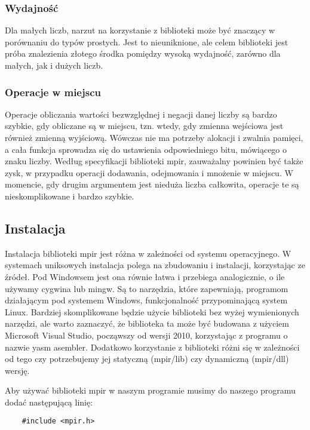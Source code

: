 \documentclass[oneside,a4paper]{book}
\begin{document}
	\subsubsection{Wydajność}
	Dla małych liczb, narzut na korzystanie z biblioteki może być znaczący w porównaniu do typów prostych. Jest to nieuniknione, ale celem biblioteki jest próba znalezienia złotego środka pomiędzy wysoką wydajność, zarówno dla małych, jak i dużych liczb. 
	
	\subsubsection{Operacje w miejscu}
	Operacje obliczania wartości bezwzględnej i negacji danej liczby są bardzo szybkie, gdy obliczane są w miejscu, tzn. wtedy, gdy zmienna wejściowa jest również zmienną wyjściową. Wówczas nie ma potrzeby alokacji i zwalnia pamięci, a cała funkcja sprowadza się do ustawienia odpowiedniego bitu, mówiącego o znaku liczby. Według specyfikacji biblioteki mpir, zauważalny powinien być także zysk, w przypadku operacji dodawania, odejmowania i mnożenie w miejscu. W momencie, gdy drugim argumentem jest nieduża liczba całkowita, operacje te są nieskomplikowane i bardzo szybkie.
	
	\subsection{Instalacja}
	
	Instalacja biblioteki mpir jest różna w zależności od systemu operacyjnego. W systemach uniksowych instalacja polega na zbudowaniu i instalacji, korzystając ze źródeł. Pod Windowsem jest ona równie łatwa i przebiega analogicznie, o ile używamy cygwina lub mingw. Są to narzędzia, które zapewniają, programom działającym pod systemem Windows, funkcjonalność przypominającą system Linux. Bardziej skomplikowane będzie użycie biblioteki bez wyżej wymienionych narzędzi, ale warto zaznaczyć, że biblioteka ta może być budowana z użyciem Microsoft Visual Studio, począwszy od wersji 2010, korzystając z programu o nazwie yasm asembler. Dodatkowo korzystanie z biblioteki różni się w zależności od tego czy potrzebujemy jej statyczną (mpir/lib) czy dynamiczną (mpir/dll) wersję.
	
	Aby używać biblioteki mpir w naszym programie musimy do naszego programu dodać następującą linię:
	\begin{lstlisting}
	#include <mpir.h>
	\end{lstlisting}
	
\end{document}
